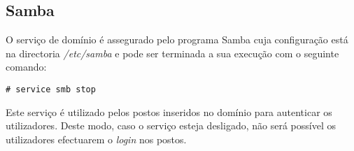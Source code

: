 \subsection{Samba}

O serviço de domínio é assegurado pelo programa Samba cuja configuração está na directoria
\emph{/etc/samba} e pode ser terminada a sua execução com o seguinte comando:

\begin{verbatim}
# service smb stop
\end{verbatim}

Este serviço é utilizado pelos postos inseridos no domínio para autenticar os utilizadores. Deste modo, caso o serviço esteja desligado, não será possível os utilizadores efectuarem o \textit{login} nos postos.

